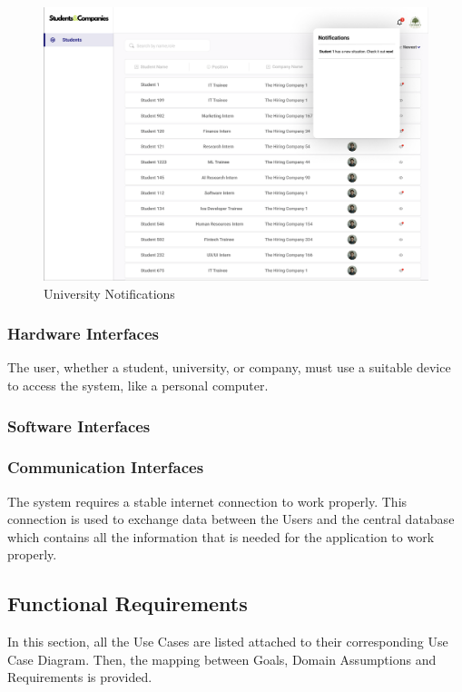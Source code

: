 \documentclass{article}
\begin{document}
\begin{figure}[H]
    \centering
    \includegraphics[scale = 0.40]{figures/UserInterfaces/University/University Notifications.png}
    \caption{University Notifications}
     \centering
\end{figure}
\subsubsection{Hardware Interfaces}
    The user, whether a student, university, or company, must use a suitable device to access the system, like a personal computer.
\subsubsection{Software Interfaces}

\subsubsection{Communication Interfaces}
    The system requires a stable internet connection to work properly. This connection is used
    to exchange data between the Users and the central database which contains all the information that is needed for the application to work properly.
\subsection{Functional Requirements}
In this section, all the Use Cases are listed attached to their corresponding Use Case Diagram.
Then, the mapping between Goals, Domain Assumptions and Requirements is provided.
\end{document}
